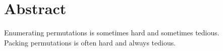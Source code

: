 \chapter*{Abstract}

Enumerating permutations is sometimes hard and sometimes tedious.\\


\noindent Packing permutations is often hard and always tedious.